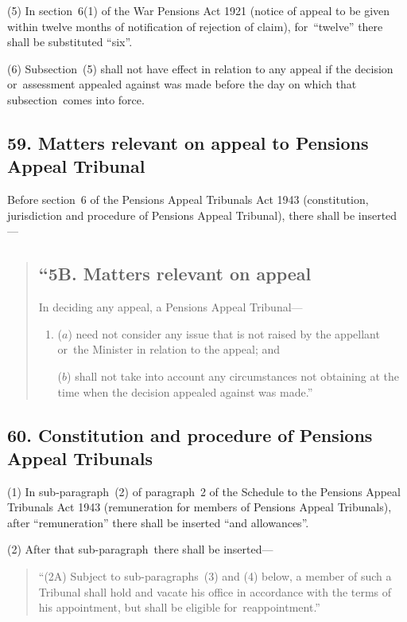 \documentclass[12pt,a4paper]{article}
\begin{document}
(5) In section~6(1)  of the War Pensions Act 1921 (notice of appeal to be given within twelve months of notification of rejection of claim), for~“twelve” there shall be substituted “six”.

(6) Subsection~(5)  shall not have effect in relation to any appeal if the decision or~assessment appealed against was made before the day on which that subsection~comes into force.

\subsection{59. Matters relevant on appeal to Pensions Appeal Tribunal}

Before section~6 of the Pensions Appeal Tribunals Act 1943 (constitution, jurisdiction and procedure of Pensions Appeal Tribunal), there shall be inserted—
\begin{quotation}
\subsection*{“5B. Matters relevant on appeal}

In deciding any appeal, a Pensions Appeal Tribunal—
\begin{enumerate}\item[]
($a$) need not consider any issue that is not raised by the appellant or~the Minister in relation to the appeal; and

($b$) shall not take into account any circumstances not obtaining at the time when the decision appealed against was made.”
\end{enumerate}
\end{quotation}

\subsection{60. Constitution and procedure of Pensions Appeal Tribunals}

(1) In sub-paragraph~(2)  of paragraph~2 of the Schedule to the Pensions Appeal Tribunals Act 1943 (remuneration for members of Pensions Appeal Tribunals), after “remuneration” there shall be inserted “and allowances”.

(2) After that sub-paragraph~there shall be inserted—
\begin{quotation}
“(2A) Subject to sub-paragraphs~(3)  and (4)  below, a member of such a Tribunal shall hold and vacate his office in accordance with the terms of his appointment, but shall be eligible for~reappointment.”
\end{quotation}
\end{document}
